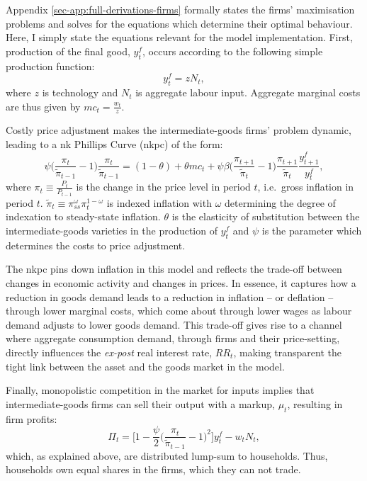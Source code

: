 \documentclass[a4paper,12pt]{article} %
\numberwithin{equation}{section} %
\numberwithin{figure}{section}
\numberwithin{table}{section}
\begin{document}
Appendix \ref{sec-app:full-derivations-firms} formally states the firms' maximisation problems and solves for the equations which determine their optimal behaviour. Here, I simply state the equations relevant for the model implementation. First, production of the final good, $y_t^f$, occurs according to the following simple production function:
\begin{equation}
    y_t^f = z N_t, \label{eq:firms-production}
\end{equation}
where $z$ is technology and $N_t$ is aggregate labour input. Aggregate marginal costs are thus given by $mc_t = \frac{w_t}{z}$. 

Costly price adjustment makes the intermediate-goods firms' problem dynamic, leading to a \Gls{nk} Phillips Curve (\Gls{nkpc}) of the form:
\begin{equation}
    \psi \Bigg( \frac{\pi_t}{\tilde{\pi}_{t-1}} - 1 \Bigg) \frac{\pi_t}{\tilde{\pi}_{t-1}} = (1-\theta) + \theta mc_t + \psi \beta \Bigg( \frac{\pi_{t+1}}{\tilde{\pi}_{t}} - 1 \Bigg) \frac{\pi_{t+1}}{\tilde{\pi}_{t}} \frac{y_{t+1}^f}{y_t^f}, \label{eq:firms-nkpc}
\end{equation}
where $\pi_t \equiv \frac{P_t}{P_{t-1}}$ is the change in the price level in period $t$, i.e.~gross inflation in period $t$. $\tilde{\pi}_t \equiv \pi_{ss}^{\omega} \pi_{t}^{1-\omega}$ is indexed inflation with $\omega$ determining the degree of indexation to steady-state inflation. $\theta$ is the elasticity of substitution between the intermediate-goods varieties in the production of $y_t^f$ and $\psi$ is the parameter which determines the costs to price adjustment.  

The \Gls{nkpc} pins down inflation in this model and reflects the trade-off between changes in economic activity and changes in prices. In essence, it captures how a reduction in goods demand leads to a reduction in inflation -- or deflation -- through lower marginal costs, which come about through lower wages as labour demand adjusts to lower goods demand. This trade-off gives rise to a channel where aggregate consumption demand, through firms and their price-setting, directly influences the \textit{ex-post} real interest rate, $RR_t$, making transparent the tight link between the asset and the goods market in the model.

Finally, monopolistic competition in the market for inputs implies that intermediate-goods firms can sell their output with a markup, $\mu_t$, resulting in firm profits:
\begin{equation}
    \Pi_t = \Bigg[ 1 - \frac{\psi}{2} \Bigg( \frac{\pi_t}{\tilde{\pi}_{t-1}} - 1 \Bigg)^2 \Bigg] y_t^f - w_t N_t, \label{eq:firms-profits}
\end{equation}
which, as explained above, are distributed lump-sum to households. Thus, households own equal shares in the firms, which they can not trade.
\end{document}
